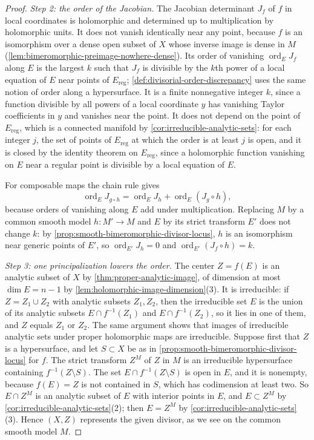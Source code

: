 \begin{proof}
\emph{Step 2: the order of the Jacobian.} The Jacobian determinant $J_f$ of $f$ in local coordinates is holomorphic and determined up to multiplication by holomorphic units. It does not vanish identically near any point, because $f$ is an isomorphism over a dense open subset of $X$ whose inverse image is dense in $M$ (\cref{lem:bimeromorphic-preimage-nowhere-dense}). Its order of vanishing $\operatorname{ord}_EJ_f$ along $E$ is the largest $k$ such that $J_f$ is divisible by the $k$th power of a local equation of $E$ near points of $E_{\mathrm{reg}}$; \cref{def:divisorial-order-discrepancy} uses the same notion of order along a hypersurface. It is a finite nonnegative integer $k$, since a function divisible by all powers of a local coordinate $y$ has vanishing Taylor coefficients in $y$ and vanishes near the point. It does not depend on the point of $E_{\mathrm{reg}}$, which is a connected manifold by \cref{cor:irreducible-analytic-sets}: for each integer $j$, the set of points of $E_{\mathrm{reg}}$ at which the order is at least $j$ is open, and it is closed by the identity theorem on $E_{\mathrm{reg}}$, since a holomorphic function vanishing on $E$ near a regular point is divisible by a local equation of $E$.

For composable maps the chain rule gives
\begin{equation}\label{eq:divisor-jacobian-order-chain}
 \operatorname{ord}_E J_{g\circ h}
 =\operatorname{ord}_E J_h+
              \operatorname{ord}_E(J_g\circ h),
\end{equation}
because orders of vanishing along $E$ add under multiplication. Replacing $M$ by a common smooth model $h\colon M'\to M$ and $E$ by its strict transform $E'$ does not change $k$: by \cref{prop:smooth-bimeromorphic-divisor-locus}, $h$ is an isomorphism near generic points of $E'$, so $\operatorname{ord}_{E'}J_h=0$ and $\operatorname{ord}_{E'}(J_f\circ h)=k$.

\emph{Step 3: one principalization lowers the order.} The center $Z=f(E)$ is an analytic subset of $X$ by \cref{thm:proper-analytic-image}, of dimension at most $\dim E=n-1$ by \cref{lem:holomorphic-image-dimension}(3). It is irreducible: if $Z=Z_1\cup Z_2$ with analytic subsets $Z_1,Z_2$, then the irreducible set $E$ is the union of its analytic subsets $E\cap f^{-1}(Z_1)$ and $E\cap f^{-1}(Z_2)$, so it lies in one of them, and $Z$ equals $Z_1$ or $Z_2$. The same argument shows that images of irreducible analytic sets under proper holomorphic maps are irreducible. Suppose first that $Z$ is a hypersurface, and let $S\subset X$ be as in \cref{prop:smooth-bimeromorphic-divisor-locus} for $f$. The strict transform $Z^M$ of $Z$ in $M$ is an irreducible hypersurface containing $f^{-1}(Z\setminus S)$. The set $E\cap f^{-1}(Z\setminus S)$ is open in $E$, and it is nonempty, because $f(E)=Z$ is not contained in $S$, which has codimension at least two. So $E\cap Z^M$ is an analytic subset of $E$ with interior points in $E$, and $E\subset Z^M$ by \cref{cor:irreducible-analytic-sets}(2); then $E=Z^M$ by \cref{cor:irreducible-analytic-sets}(3). Hence $(X,Z)$ represents the given divisor, as we see on the common smooth model $M$.


\end{proof}

